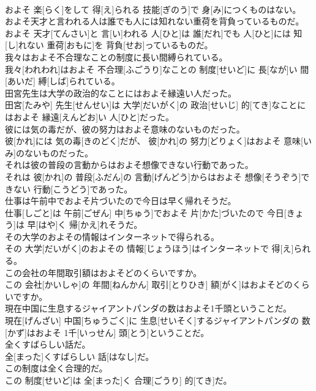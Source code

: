 \documentclass[8pt]{extreport}
\begin{document}
\begin{CJK}{UTF8}{min}
\\	およそ 楽[らく]をして 得[え]られる 技能[ぎのう]で 身[み]につくものはない。
\\	およそ天才と言われる人は誰でも人には知れない重荷を背負っているものだ。	
\\	およそ 天才[てんさい]と 言[い]われる 人[ひと]は 誰[だれ]でも 人[ひと]には 知[し]れない 重荷[おもに]を 背負[せお]っているものだ。
\\	我々はおよそ不合理なことの制度に長い間縛られている。	
\\	我々[われわれ]はおよそ 不合理[ふごうり]なことの 制度[せいど]に 長[なが]い 間[あいだ] 縛[しば]られている。
\\	田宮先生は大学の政治的なことにはおよそ縁遠い人だった。	
\\	田宮[たみや] 先生[せんせい]は 大学[だいがく]の 政治[せいじ] 的[てき]なことにはおよそ 縁遠[えんどお]い 人[ひと]だった。
\\	彼には気の毒だが、彼の努力はおよそ意味のないものだった。	
\\	彼[かれ]には 気の毒[きのどく]だが、 彼[かれ]の 努力[どりょく]はおよそ 意味[いみ]のないものだった。
\\	それは彼の普段の言動からはおよそ想像できない行動であった。	
\\	それは 彼[かれ]の 普段[ふだん]の 言動[げんどう]からはおよそ 想像[そうぞう]できない 行動[こうどう]であった。
\\	仕事は午前中でおよそ片づいたので今日は早く帰れそうだ。	
\\	仕事[しごと]は 午前[ごぜん] 中[ちゅう]でおよそ 片[かた]づいたので 今日[きょう]は 早[はや]く 帰[かえ]れそうだ。
\\	その大学のおよその情報はインターネットで得られる。	
\\	その 大学[だいがく]のおよその 情報[じょうほう]はインターネットで 得[え]られる。
\\	この会社の年間取引額はおよそどのくらいですか。	
\\	この 会社[かいしゃ]の 年間[ねんかん] 取引[とりひき] 額[がく]はおよそどのくらいですか。
\\	現在中国に生息するジャイアントパンダの数はおよそ1千頭ということだ。	
\\	現在[げんざい] 中国[ちゅうごく]に 生息[せいそく]するジャイアントパンダの 数[かず]はおよそ 1千[いっせん] 頭[とう]ということだ。
\\	全くすばらしい話だ。	
\\	全[まった]くすばらしい 話[はなし]だ。
\\	この制度は全く合理的だ。	
\\	この 制度[せいど]は 全[まった]く 合理[ごうり] 的[てき]だ。

\end{CJK}
\end{document}
